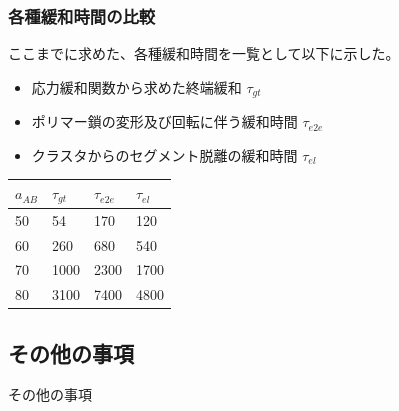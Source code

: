 \documentclass[12pt, dvipdfmx]{beamer}
\begin{document}
\begin{frame}
\frametitle{各種緩和時間の比較}

ここまでに求めた、各種緩和時間を一覧として以下に示した。

\begin{itemize}
\item
応力緩和関数から求めた終端緩和 $\tau_{gt}$
\item
ポリマー鎖の変形及び回転に伴う緩和時間 $\tau_{e2e}$
\item
クラスタからのセグメント脱離の緩和時間 $\tau_{el}$
\end{itemize}

\centering
\begin{tabular}{p{5em} p{5em} p{5em} p{5em}} \hline
\hfil $a_{AB}$ \hfil	&	\hfil $\tau_{gt}$ \hfil &	\hfil $\tau_{e2e}$ \hfil	&	\hfil $\tau_{el}$ \hfil	\\ \hline \hline
\hfil 50 \hfil			&	\hfil 54 \hfil			&	\hfil 170 \hfil				&	\hfil 120 \hfil				\\ 
\hfil 60 \hfil			&	\hfil 260 \hfil			&	\hfil 680 \hfil				&	\hfil 540 \hfil				\\ 
\hfil 70 \hfil			&	\hfil 1000 \hfil		&	\hfil 2300 \hfil			&	\hfil 1700 \hfil				\\ 
\hfil 80 \hfil			&	\hfil 3100 \hfil		&	\hfil 7400 \hfil			&	\hfil 4800 \hfil				\\ \hline
\end{tabular}


\end{frame}


\subsection{その他の事項}
\begin{frame}
\LARGE{その他の事項}
\end{frame}
\end{document}
